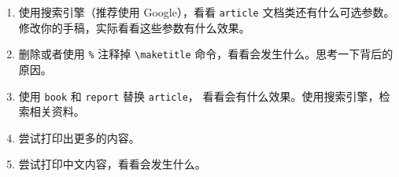 \begin{enumerate}
  \item 使用搜索引擎（推荐使用 Google），看看 \lstinline[style = iltx]|article|
  文档类还有什么可选参数。修改你的手稿，实际看看这些参数有什么效果。
  \item 删除或者使用 \lstinline[style = iltx]|%| 注释掉
  \lstinline[style = iltx]|\maketitle| 命令，看看会发生什么。思考一下背后的原因。
  \item 使用 \lstinline[style = iltx]|book| 和
  \lstinline[style = iltx]|report| 替换 \lstinline[style = iltx]|article|，
  看看会有什么效果。使用搜索引擎，检索相关资料。
  \item 尝试打印出更多的内容。
  \item 尝试打印中文内容，看看会发生什么。
\end{enumerate}

\endinput
